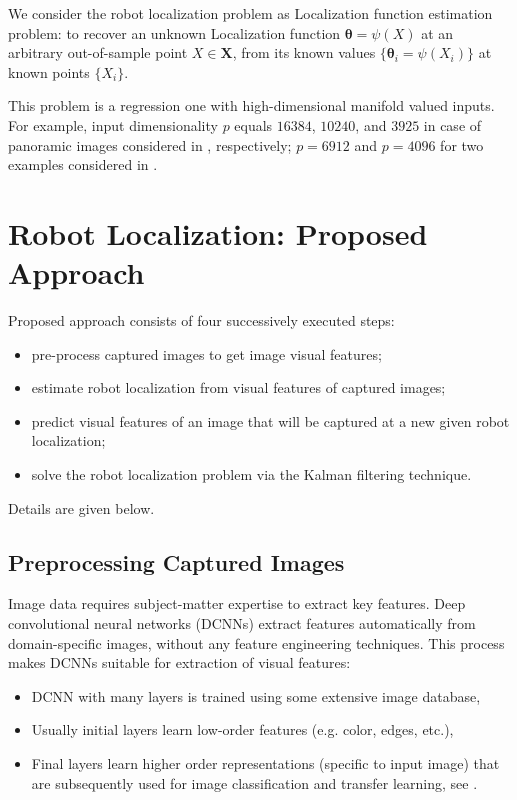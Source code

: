 \documentclass[conference]{IEEEtran} %
\def\mbtheta{{\bm\theta}}
\def\mbX{\mathbf{X}}
\begin{document}
We consider the robot localization problem as Localization function estimation problem: to recover an unknown Localization function $\mbtheta = \psi(X)$ at an arbitrary out-of-sample point $X \in \mbX$, from its known values $\{\mbtheta_i = \psi(X_i)\}$ at known points $\{X_i\}$.

This problem is a regression one with high-dimensional manifold valued inputs. For example, input dimensionality $p$ equals $16384$, $10240$, and $3925$ in case of panoramic images considered in \cite{bib7,bib8,bib9}, respectively; $p = 6912$ and $p = 4096$ for two examples considered in \cite{bib10}.

\section{Robot Localization: Proposed Approach}
\label{sec3}

Proposed approach consists of four successively executed steps:
\begin{itemize}
	\item
    	pre-process captured images to get image visual features;
     \item
     	estimate robot localization from visual features of captured images;
     \item
     	predict visual features of an image that will be captured at a new given robot localization;
     \item
     	solve the robot localization problem via the Kalman filtering technique.
\end{itemize}
Details are given below.

\subsection{Preprocessing Captured Images}
\label{sec3.1}
Image data requires subject-matter expertise to extract key features. Deep convolutional neural networks (DCNNs) extract features automatically from domain-specific images, without any feature engineering techniques. This process makes DCNNs suitable for extraction of visual features:
\begin{itemize}
\item DCNN with many layers is trained using some extensive image database,
\item Usually initial layers learn low-order features (e.g. color, edges, etc.),
\item Final layers learn higher order representations (specific to input image) that are subsequently used for image classification and transfer learning, see \cite{trans2}.
\end{itemize}
\end{document}
